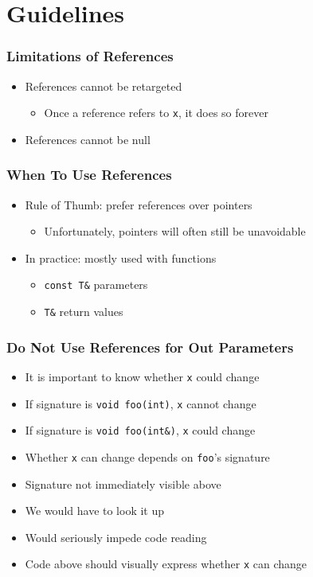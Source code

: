 \section{Guidelines}

\frame{\tableofcontents[currentsection]}

\begin{frame}
  \frametitle{Limitations of References}
  \begin{itemize}
    \item References cannot be retargeted
          \begin{itemize}
            \item Once a reference refers to \texttt{x}, it does so forever
          \end{itemize}
    \item References cannot be null
  \end{itemize}
  \vskip4mm
\end{frame}

\begin{frame}
  \frametitle{When To Use References}
  \begin{itemize}
    \item Rule of Thumb: prefer references over pointers
          \begin{itemize}
            \item Unfortunately, pointers will often still be unavoidable
          \end{itemize}
    \item In practice: mostly used with functions
          \begin{itemize}
            \item \texttt{const T\&} parameters
            \item \texttt{T\&} return values
          \end{itemize}
  \end{itemize}
\end{frame}

\begin{frame}
  \frametitle{Do Not Use References for Out Parameters}
  \begin{itemize}
    \item It is important to know whether \texttt{x} could change
    \item If signature is \texttt{void foo(int)}, \texttt{x} cannot change
    \item If signature is \texttt{void foo(int\&)}, \texttt{x} could change
    \item Whether \texttt{x} can change depends on \texttt{foo}'s signature
    \item Signature not immediately visible above
    \item We would have to look it up
    \item Would seriously impede code reading
    \item Code above should visually express whether \texttt{x} can change
  \end{itemize}
\end{frame}

